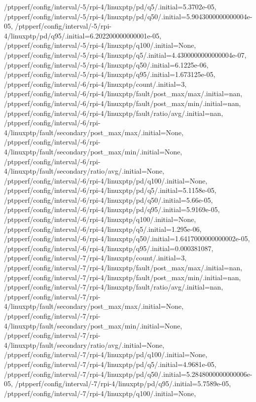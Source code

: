 {    /ptpperf/config/interval/-5/rpi-4/linuxptp/pd/q5/.initial=5.3702e-05,
    /ptpperf/config/interval/-5/rpi-4/linuxptp/pd/q50/.initial=5.9043000000000004e-05,
    /ptpperf/config/interval/-5/rpi-4/linuxptp/pd/q95/.initial=6.202200000000001e-05,
    /ptpperf/config/interval/-5/rpi-4/linuxptp/q100/.initial=None,
    /ptpperf/config/interval/-5/rpi-4/linuxptp/q5/.initial=4.4300000000000004e-07,
    /ptpperf/config/interval/-5/rpi-4/linuxptp/q50/.initial=6.1225e-06,
    /ptpperf/config/interval/-5/rpi-4/linuxptp/q95/.initial=1.673125e-05,
    /ptpperf/config/interval/-6/rpi-4/linuxptp/count/.initial=3,
    /ptpperf/config/interval/-6/rpi-4/linuxptp/fault/post_max/max/.initial=nan,
    /ptpperf/config/interval/-6/rpi-4/linuxptp/fault/post_max/min/.initial=nan,
    /ptpperf/config/interval/-6/rpi-4/linuxptp/fault/ratio/avg/.initial=nan,
    /ptpperf/config/interval/-6/rpi-4/linuxptp/fault/secondary/post_max/max/.initial=None,
    /ptpperf/config/interval/-6/rpi-4/linuxptp/fault/secondary/post_max/min/.initial=None,
    /ptpperf/config/interval/-6/rpi-4/linuxptp/fault/secondary/ratio/avg/.initial=None,
    /ptpperf/config/interval/-6/rpi-4/linuxptp/pd/q100/.initial=None,
    /ptpperf/config/interval/-6/rpi-4/linuxptp/pd/q5/.initial=5.1158e-05,
    /ptpperf/config/interval/-6/rpi-4/linuxptp/pd/q50/.initial=5.66e-05,
    /ptpperf/config/interval/-6/rpi-4/linuxptp/pd/q95/.initial=5.9169e-05,
    /ptpperf/config/interval/-6/rpi-4/linuxptp/q100/.initial=None,
    /ptpperf/config/interval/-6/rpi-4/linuxptp/q5/.initial=1.295e-06,
    /ptpperf/config/interval/-6/rpi-4/linuxptp/q50/.initial=1.6417000000000002e-05,
    /ptpperf/config/interval/-6/rpi-4/linuxptp/q95/.initial=0.000381087,
    /ptpperf/config/interval/-7/rpi-4/linuxptp/count/.initial=3,
    /ptpperf/config/interval/-7/rpi-4/linuxptp/fault/post_max/max/.initial=nan,
    /ptpperf/config/interval/-7/rpi-4/linuxptp/fault/post_max/min/.initial=nan,
    /ptpperf/config/interval/-7/rpi-4/linuxptp/fault/ratio/avg/.initial=nan,
    /ptpperf/config/interval/-7/rpi-4/linuxptp/fault/secondary/post_max/max/.initial=None,
    /ptpperf/config/interval/-7/rpi-4/linuxptp/fault/secondary/post_max/min/.initial=None,
    /ptpperf/config/interval/-7/rpi-4/linuxptp/fault/secondary/ratio/avg/.initial=None,
    /ptpperf/config/interval/-7/rpi-4/linuxptp/pd/q100/.initial=None,
    /ptpperf/config/interval/-7/rpi-4/linuxptp/pd/q5/.initial=4.9681e-05,
    /ptpperf/config/interval/-7/rpi-4/linuxptp/pd/q50/.initial=5.2848000000000006e-05,
    /ptpperf/config/interval/-7/rpi-4/linuxptp/pd/q95/.initial=5.7589e-05,
    /ptpperf/config/interval/-7/rpi-4/linuxptp/q100/.initial=None,
}
